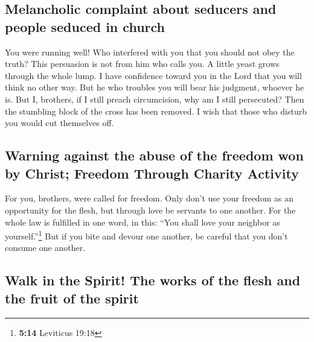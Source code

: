 \hypertarget{melancholic-complaint-about-seducers-and-people-seduced-in-church}{%
\subsection{Melancholic complaint about seducers and people seduced in
church}\label{melancholic-complaint-about-seducers-and-people-seduced-in-church}}

 You were running well! Who interfered with you that you
should not obey the truth?  This persuasion is not from
him who calls you.  A little yeast grows through the whole
lump.  I have confidence toward you in the Lord that you
will think no other way. But he who troubles you will bear his judgment,
whoever he is.  But I, brothers, if I still preach
circumcision, why am I still persecuted? Then the stumbling block of the
cross has been removed.  I wish that those who disturb
you would cut themselves off.

\hypertarget{warning-against-the-abuse-of-the-freedom-won-by-christ-freedom-through-charity-activity}{%
\subsection{Warning against the abuse of the freedom won by Christ;
Freedom Through Charity
Activity}\label{warning-against-the-abuse-of-the-freedom-won-by-christ-freedom-through-charity-activity}}

 For you, brothers, were called for freedom. Only don't
use your freedom as an opportunity for the flesh, but through love be
servants to one another.  For the whole law is fulfilled
in one word, in this: ``You shall love your neighbor as
yourself.''\footnote{\textbf{5:14} Leviticus 19:18}  But
if you bite and devour one another, be careful that you don't consume
one another.

\hypertarget{walk-in-the-spirit-the-works-of-the-flesh-and-the-fruit-of-the-spirit}{%
\subsection{Walk in the Spirit! The works of the flesh and the fruit of
the
spirit}\label{walk-in-the-spirit-the-works-of-the-flesh-and-the-fruit-of-the-spirit}}

